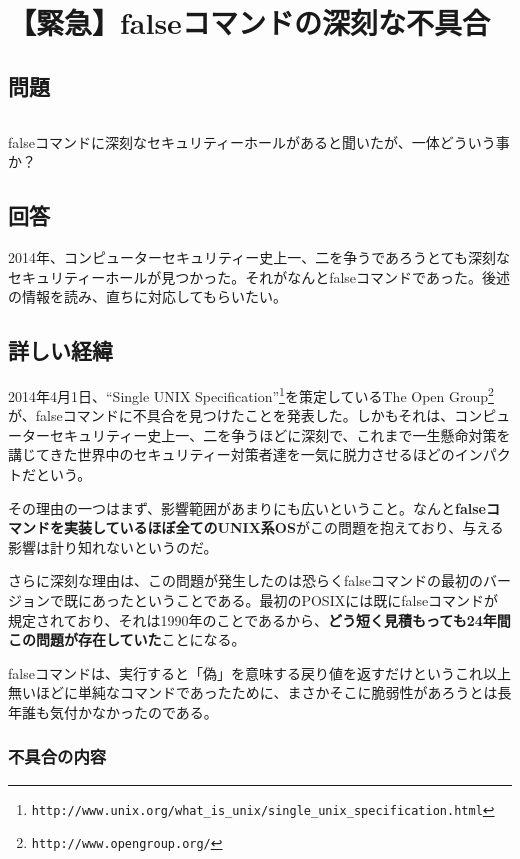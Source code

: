 \section{【緊急】falseコマンドの深刻な不具合}

\subsection*{問題}
\noindent
$\!\!\!\!\!$
\begin{grshfboxit}{160.0mm}
	falseコマンドに深刻なセキュリティーホールがあると聞いたが、一体どういう事か？
\end{grshfboxit}

\subsection*{回答}

2014年、コンピューターセキュリティー史上一、二を争うであろうとても深刻なセキュリティーホールが見つかった。それがなんとfalseコマンドであった。後述の情報を読み、直ちに対応してもらいたい。


\subsection*{詳しい経緯}

2014年4月1日、``Single UNIX Specification''\footnote{\verb|http://www.unix.org/what_is_unix/single_unix_specification.html|}を策定しているThe Open Group\footnote{\verb|http://www.opengroup.org/|}が、falseコマンドに不具合を見つけたことを発表した。しかもそれは、コンピューターセキュリティー史上一、二を争うほどに深刻で、これまで一生懸命対策を講じてきた世界中のセキュリティー対策者達を一気に脱力させるほどのインパクトだという。

その理由の一つはまず、影響範囲があまりにも広いということ。なんと\textbf{falseコマンドを実装しているほぼ全てのUNIX系OS}がこの問題を抱えており、与える影響は計り知れないというのだ。

さらに深刻な理由は、この問題が発生したのは恐らくfalseコマンドの最初のバージョンで既にあったということである。最初のPOSIXには既にfalseコマンドが規定されており、それは1990年のことであるから、\textbf{どう短く見積もっても24年間この問題が存在していた}ことになる。

falseコマンドは、実行すると「偽」を意味する戻り値を返すだけというこれ以上無いほどに単純なコマンドであったために、まさかそこに脆弱性があろうとは長年誰も気付かなかったのである。

\subsubsection*{不具合の内容}

